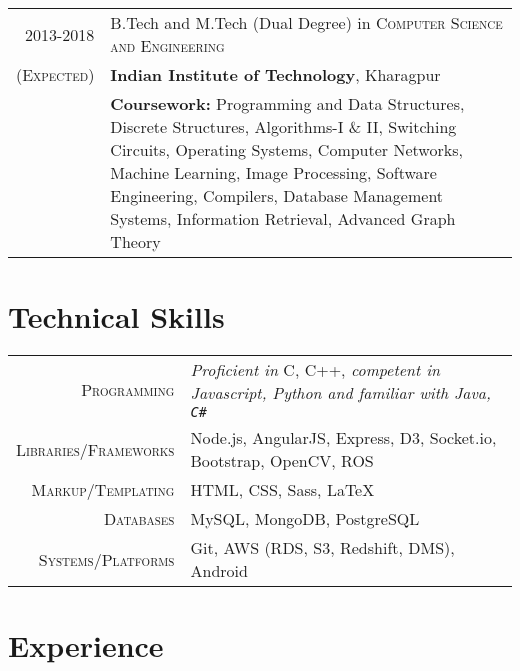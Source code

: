 \documentclass[a4paper,10pt]{extarticle} %
\begin{document}
\begin{tabular}{r|p{17.5cm}}	
2013-2018 & B.Tech and M.Tech (Dual Degree) in \textsc{Computer Science and Engineering}\\
\textsc{(Expected)}&\textbf{Indian Institute of Technology}, Kharagpur\\
&\textbf{Coursework: }{Programming and Data Structures, Discrete Structures, Algorithms-I \& II, Switching Circuits, Operating Systems, Computer Networks, Machine Learning, Image Processing, Software Engineering, Compilers, Database Management Systems, Information Retrieval, Advanced Graph Theory}
\end{tabular}


\section{Technical Skills}

\begin{tabular}{r|p{17.5cm}}
\textsc{Programming} & {\itshape{Proficient in}} C, C++, \itshape{competent in} Javascript, Python and \itshape{familiar with} Java, \verb!C#! \\
\textsc{Libraries/Frameworks} & Node.js, AngularJS, Express, D3, Socket.io, Bootstrap, OpenCV, ROS\\
\textsc{Markup/Templating} & HTML, CSS, Sass, \LaTeX\\
\textsc{Databases} & MySQL, MongoDB, PostgreSQL\\
\textsc{Systems/Platforms} & Git, AWS (RDS, S3, Redshift, DMS), Android
\end{tabular}

\section{Experience}
\end{document}
